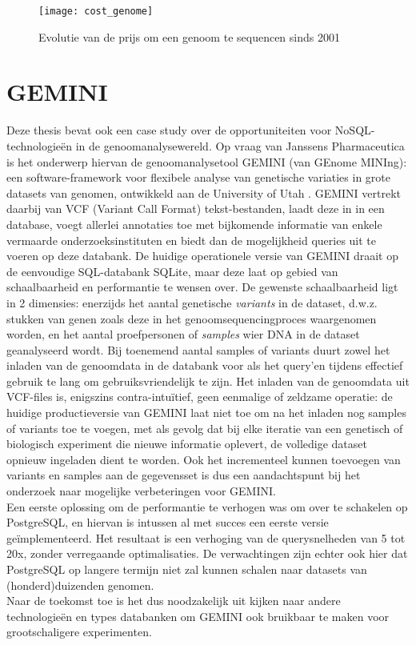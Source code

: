\begin{figure}[h!]
\texttt{[image: cost\_genome]}
\caption{Evolutie van de prijs om een genoom te sequencen sinds 2001}
\label{sequencing_cost}
\end{figure}

\section{GEMINI}

Deze thesis bevat ook een case study over de opportuniteiten voor NoSQL-technologie\"en in de genoomanalysewereld. Op vraag van Janssens Pharmaceutica is het onderwerp hiervan de genoomanalysetool GEMINI (van GEnome MINIng): een software-framework voor flexibele analyse van genetische variaties in grote datasets van genomen, ontwikkeld aan de University of Utah \cite{10.1371/journal.pcbi.1003153}. GEMINI vertrekt daarbij van VCF (Variant Call Format) tekst-bestanden, laadt deze in in een database, voegt allerlei annotaties toe met bijkomende informatie van enkele vermaarde onderzoeksinstituten en biedt dan de mogelijkheid queries uit te voeren op deze databank. De huidige operationele versie van GEMINI draait op de eenvoudige SQL-databank SQLite, maar deze laat op gebied van schaalbaarheid en performantie te wensen over. De gewenste schaalbaarheid ligt in 2 dimensies: enerzijds het aantal genetische \textit{variants} in de dataset, d.w.z. stukken van genen zoals deze in het genoomsequencingproces waargenomen worden, en het aantal proefpersonen of \textit{samples} wier DNA in de dataset geanalyseerd wordt. Bij toenemend 
aantal samples of variants duurt zowel het inladen van de genoomdata in de databank voor als het query'en tijdens effectief gebruik te lang om gebruiksvriendelijk te zijn. Het inladen van de genoomdata uit VCF-files is, enigszins contra-intu\"itief, geen eenmalige of zeldzame operatie: de huidige productieversie van GEMINI laat niet toe om na het inladen nog samples of variants toe te voegen, met als gevolg dat bij elke iteratie van een genetisch of biologisch experiment die nieuwe informatie oplevert, de volledige dataset opnieuw ingeladen dient te worden. Ook het incrementeel kunnen toevoegen van variants en samples aan de gegevensset is dus een aandachtspunt bij het onderzoek naar mogelijke verbeteringen voor GEMINI.\\
Een eerste oplossing om de performantie te verhogen was om over te schakelen op PostgreSQL, en hiervan is intussen al met succes een eerste versie ge\"implementeerd. Het resultaat is een verhoging van de querysnelheden van 5 tot 20x, zonder verregaande optimalisaties. De verwachtingen zijn echter ook hier dat PostgreSQL op langere termijn niet zal kunnen schalen naar datasets van (honderd)duizenden genomen.\\
Naar de toekomst toe is het dus noodzakelijk uit kijken naar andere technologie\"en en types databanken om GEMINI ook bruikbaar te maken voor grootschaligere experimenten.



